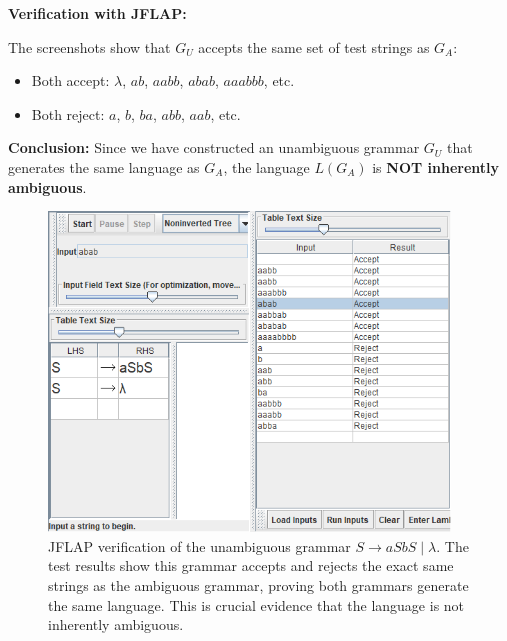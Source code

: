 \documentclass[12pt]{article}
\begin{document}
\textbf{Verification with JFLAP:}

The screenshots show that $G_U$ accepts the same set of test strings as $G_A$:
\begin{itemize}
\item Both accept: $\lambda$, $ab$, $aabb$, $abab$, $aaabbb$, etc.
\item Both reject: $a$, $b$, $ba$, $abb$, $aab$, etc.
\end{itemize}

\textbf{Conclusion:} Since we have constructed an unambiguous grammar $G_U$ that generates the same language as $G_A$, the language $L(G_A)$ is \textbf{NOT inherently ambiguous}.

\begin{figure}[H]
\centering
\includegraphics[width=0.95\textwidth]{Problem 4/Unambiguous Grammer-Tests.png}
\caption{JFLAP verification of the unambiguous grammar $S \rightarrow aSbS \mid \lambda$. The test results show this grammar accepts and rejects the exact same strings as the ambiguous grammar, proving both grammars generate the same language. This is crucial evidence that the language is not inherently ambiguous.}
\label{fig:problem4_unambiguous_tests}
\end{figure}
\end{document}
